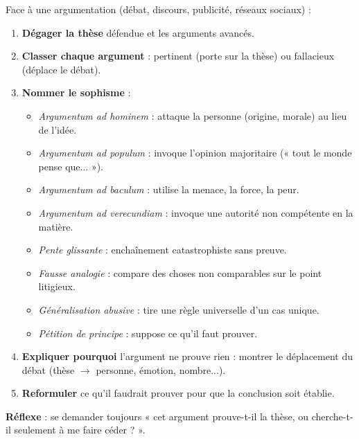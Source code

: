 \documentclass[11pt]{article}
\begin{document}
\begin{methode}
Face à une argumentation (débat, discours, publicité, réseaux sociaux) :
\begin{enumerate}
\item \textbf{Dégager la thèse} défendue et les arguments avancés.
\item \textbf{Classer chaque argument} : pertinent (porte sur la thèse) ou fallacieux (déplace le débat).
\item \textbf{Nommer le sophisme} :
  \begin{itemize}
  \item \emph{Argumentum ad hominem} : attaque la personne (origine, morale) au lieu de l'idée.
  \item \emph{Argumentum ad populum} : invoque l'opinion majoritaire (« tout le monde pense que... »).
  \item \emph{Argumentum ad baculum} : utilise la menace, la force, la peur.
  \item \emph{Argumentum ad verecundiam} : invoque une autorité non compétente en la matière.
  \item \emph{Pente glissante} : enchaînement catastrophiste sans preuve.
  \item \emph{Fausse analogie} : compare des choses non comparables sur le point litigieux.
  \item \emph{Généralisation abusive} : tire une règle universelle d'un cas unique.
  \item \emph{Pétition de principe} : suppose ce qu'il faut prouver.
  \end{itemize}
\item \textbf{Expliquer pourquoi} l'argument ne prouve rien : montrer le déplacement du débat (thèse $\rightarrow$ personne, émotion, nombre...).
\item \textbf{Reformuler} ce qu'il faudrait prouver pour que la conclusion soit établie.
\end{enumerate}
\textbf{Réflexe} : se demander toujours « cet argument prouve-t-il la thèse, ou cherche-t-il seulement à me faire céder ? ».
\end{methode}
\end{document}

